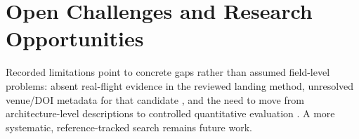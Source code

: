 \section{Open Challenges and Research Opportunities}

Recorded limitations point to concrete gaps rather than assumed field-level
problems: absent real-flight evidence in the reviewed landing method, unresolved
venue/DOI metadata for that candidate \cite{p_2607_02277}, and the need to move
from architecture-level descriptions to controlled quantitative evaluation
\cite{p_2609_19961}. A more systematic, reference-tracked search remains future
work.
